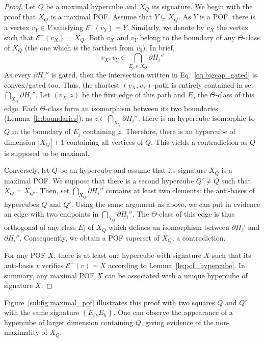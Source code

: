 \documentclass[a4paper,UKenglish,numberwithinsect,cleveref, autoref,anonymous]{lipics-v2021}
\newcommand{\set}[1]{\left\{ #1 \right\}}
\newcommand{\card}[1]{\left| #1 \right|}
\begin{document}
\begin{proof}
Let $Q$ be a maximal hypercube and $X_Q$ its signature. We begin with the proof that $X_Q$ is a maximal POF. Assume that $Y \subsetneq X_Q$. As $Y$ is a POF, there is a vertex $v_Y \in V$ satisfying $\mathcal{E}^-(v_Y) = Y$. Similarly, we denote by $v_X$ the vertex such that $\mathcal{E}^-(v_X) = X_Q$. Both $v_X$ and $v_Y$ belong to the boundary of any $\Theta$-class of $X_Q$ (the one which is the farthest from $v_0$). In brief, 
\begin{equation}v_X,v_Y \in \bigcap_{E_i \in X_Q} \partial H_i''
\label{eq:bigcap_gated}
\end{equation}
As every $\partial H_i''$ is gated, then the intersection written in Eq.~\eqref{eq:bigcap_gated} is convex/gated too. Thus, the shortest $(v_X,v_Y)$-path is entirely contained in set $\bigcap_{X_Q} \partial H_i''$. Let $(v_X,z)$ be the first edge of this path and $E_j$ the $\Theta$-class of this edge. Each $\Theta$-class form an isomorphism between its two boundaries (Lemma~\ref{le:boundaries}): as $z \in \bigcap_{X_Q} \partial H_i''$, there is an hypercube isomorphic to $Q$ in the boundary of $E_j$ containing $z$. Therefore, there is an hypercube of dimension $\card{X_Q}+1$ containing all vertices of $Q$. This yields a contradiction as $Q$ is supposed to be maximal.

Conversely, let $Q$ be an hypercube and assume that its signature $X_Q$ is a maximal POF. We suppose that there is a second hypercube $Q' \neq Q$ such that $X_Q = X_{Q'}$. Then, set $\bigcap_{X_Q} \partial H_i''$ contains at least two elements: the anti-bases of hypercubes $Q$ and $Q'$. Using the same argument as above, we can put in evidence an edge with two endpoints in $\bigcap_{X_Q} \partial H_i''$. The $\Theta$-class of this edge is thus orthogonal of any class $E_i$ of $X_Q$ which defines an isomorphism between $\partial H_i'$ and $\partial H_i''$. Consequently, we obtain a POF superset of $X_Q$, a contradiction.

For any POF $X$, there is at least one hypercube with signature $X$ such that its anti-basis $v$ verifies $\mathcal{E}^-(v) = X$ according to Lemma~\ref{le:pof_hypercube}. In summary, any maximal POF $X$ can be associated with a unique hypercube of signature $X$.
\end{proof}

Figure~\ref{subfig:maximal_pof} illustrates this proof with two squares $Q$ and $Q'$ with the same signature $\set{E_i,E_h}$. One can observe the appearance of a hypercube of larger dimension containing $Q$, giving evidence of the non-maximality of $X_Q$.
\end{document}
